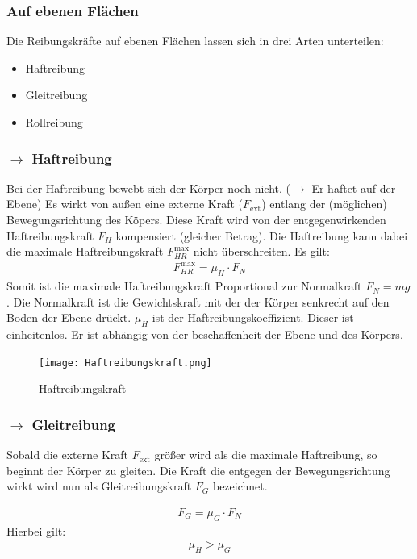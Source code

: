 \documentclass{article}
\begin{document}
\subsubsection*{Auf ebenen Flächen}
Die Reibungskräfte auf ebenen Flächen lassen sich in drei Arten unterteilen:
\begin{itemize}
    \item Haftreibung 
    \item Gleitreibung
    \item Rollreibung
\end{itemize}
\subsubsection*{$\rightarrow$ Haftreibung}
Bei der Haftreibung bewebt sich der Körper noch nicht. ($\rightarrow$ Er haftet auf der Ebene)
Es wirkt von außen eine externe Kraft ($F_{\mathrm{ext}}$) entlang der (möglichen) Bewegungsrichtung des Köpers.
Diese Kraft wird von der entgegenwirkenden Haftreibungskraft $F_H$ kompensiert (gleicher Betrag).
Die Haftreibung kann dabei die maximale Haftreibungskraft $F_{HR}^{\mathrm{max}}$ nicht überschreiten.
Es gilt: 
\begin{align}
    F_{HR}^\mathrm{max}=\mu_H\cdot F_N
\end{align}
Somit ist die maximale Haftreibungskraft Proportional zur Normalkraft $F_N=mg$. Die Normalkraft ist die
Gewichtskraft mit der der Körper senkrecht auf den Boden der Ebene drückt.
$\mu_H$ ist der Haftreibungskoeffizient. Dieser ist einheitenlos. Er ist abhängig von der beschaffenheit der Ebene und des Körpers.


\begin{figure}[H]  %
    \centering      %
    \texttt{[image: Haftreibungskraft.png]} %
    \caption{Haftreibungskraft} %
    \label{fig:Haftreibungskraft} %
\end{figure}


\subsubsection*{$\rightarrow$ Gleitreibung}
Sobald die externe Kraft $F_\mathrm{ext}$ größer wird als die maximale Haftreibung, so beginnt der 
Körper zu gleiten. Die Kraft die entgegen der Bewegungsrichtung wirkt wird nun als Gleitreibungskraft $F_G$ bezeichnet.

\begin{align}
    F_G=\mu_G\cdot F_N
\end{align}
Hierbei gilt:
\begin{align}
    \mu_H>\mu_G
\end{align}
\end{document}
